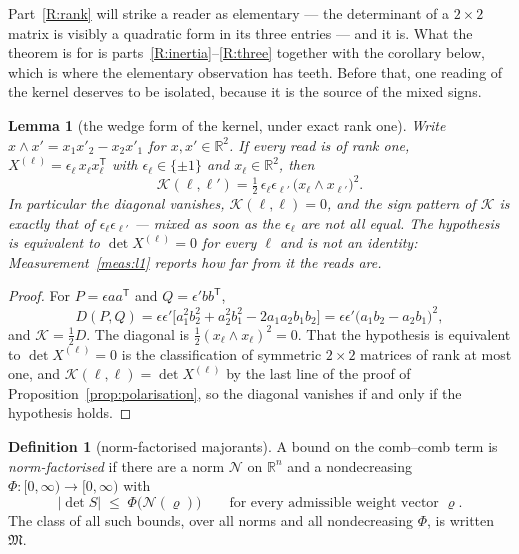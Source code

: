 \documentclass[11pt,a4paper]{article}
\theoremstyle{plain}
\newtheorem{lemma}[theorem]{Lemma}
\theoremstyle{definition}
\newtheorem{definition}[theorem]{Definition}
\newcommand{\R}{\mathbb{R}}
\newcommand{\T}{\mathsf{T}}
\begin{document}
Part~\ref{R:rank} will strike a reader as elementary --- the determinant of a
$2\times2$ matrix is visibly a quadratic form in its three entries --- and it
is. What the theorem is for is parts~\ref{R:inertia}--\ref{R:three} together
with the corollary below, which is where the elementary observation has teeth.
Before that, one reading of the kernel deserves to be isolated, because it is
the source of the mixed signs.

\begin{lemma}[the wedge form of the kernel, under exact rank one]
\label{lem:wedge}
Write $x\wedge x'=x_1x'_2-x_2x'_1$ for $x,x'\in\R^{2}$. If every read is of
rank one, $X^{(\ell)}=\epsilon_\ell\,x_\ell x_\ell^{\T}$ with
$\epsilon_\ell\in\{\pm1\}$ and $x_\ell\in\R^{2}$, then
\begin{equation}
\label{eq:wedge}
  \mathcal K(\ell,\ell')
  =\tfrac12\,\epsilon_\ell\epsilon_{\ell'}\,
  \bigl(x_\ell\wedge x_{\ell'}\bigr)^{2} .
\end{equation}
In particular the diagonal vanishes, $\mathcal K(\ell,\ell)=0$, and the sign
pattern of $\mathcal K$ is exactly that of $\epsilon_\ell\epsilon_{\ell'}$ ---
mixed as soon as the $\epsilon_\ell$ are not all equal. The hypothesis is
equivalent to $\det X^{(\ell)}=0$ for every $\ell$ and is \emph{not} an
identity: Measurement~\ref{meas:l1} reports how far from it the reads are.
\end{lemma}

\begin{proof}
For $P=\epsilon aa^{\T}$ and $Q=\epsilon'bb^{\T}$,
\[
  D(P,Q)=\epsilon\epsilon'\bigl[a_1^{2}b_2^{2}+a_2^{2}b_1^{2}
  -2a_1a_2b_1b_2\bigr]
  =\epsilon\epsilon'\bigl(a_1b_2-a_2b_1\bigr)^{2},
\]
and $\mathcal K=\tfrac12D$. The diagonal is
$\tfrac12(x_\ell\wedge x_\ell)^{2}=0$. That the hypothesis is equivalent to
$\det X^{(\ell)}=0$ is the classification of symmetric $2\times2$ matrices of
rank at most one, and $\mathcal K(\ell,\ell)=\det X^{(\ell)}$ by the last line
of the proof of Proposition~\ref{prop:polarisation}, so the diagonal vanishes
if and only if the hypothesis holds.
\end{proof}

\begin{definition}[norm-factorised majorants]
\label{def:majclass}
A bound on the comb--comb term is \emph{norm-factorised} if there are a norm
$\mathcal N$ on $\R^{n}$ and a nondecreasing
$\Phi:[0,\infty)\to[0,\infty)$ with
\begin{equation}
\label{eq:majclass}
  |\det S|\;\le\;\Phi\bigl(\mathcal N(\varrho)\bigr)
  \qquad\text{for every admissible weight vector }\varrho .
\end{equation}
The class of all such bounds, over all norms and all nondecreasing $\Phi$, is
written $\mathfrak M$.
\end{definition}
\end{document}
